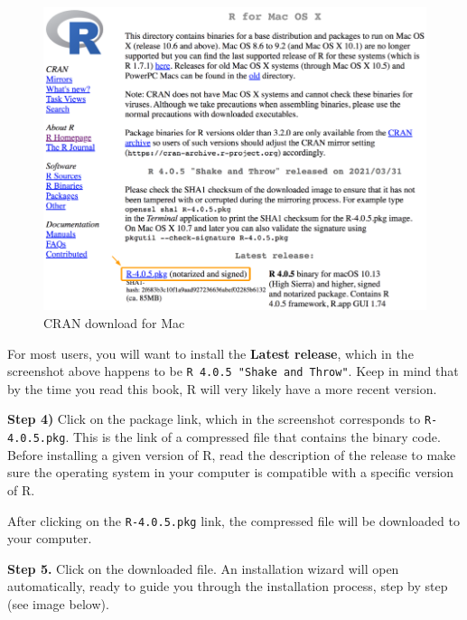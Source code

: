 \documentclass[
]{book}
\begin{document}
\begin{figure}

{\centering \includegraphics[width=0.7\linewidth]{images/install/cran-mac} 

}

\caption{CRAN download for Mac}\label{fig:unnamed-chunk-7}
\end{figure}

For most users, you will want to install the \textbf{Latest release}, which in the screenshot above happens to be \texttt{R\ 4.0.5\ "Shake\ and\ Throw"}. Keep in mind that
by the time you read this book, R will very likely have a more recent version.

\textbf{Step 4)} Click on the package link, which in the screenshot corresponds to
\texttt{R-4.0.5.pkg}. This is the link of a compressed file that contains the binary
code. Before installing a given version of R, read the
description of the release to make sure the operating system in your computer
is compatible with a specific version of R.

After clicking on the \texttt{R-4.0.5.pkg} link, the compressed file will be
downloaded to your computer.

\textbf{Step 5.} Click on the downloaded file. An installation wizard will open
automatically, ready to guide you through the installation process, step by
step (see image below).
\end{document}

